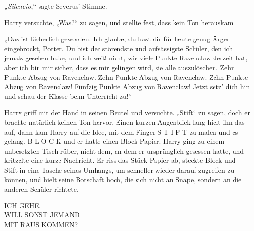 „\emph{Silencio},“ sagte Severus’ Stimme.

Harry versuchte, „Was?“ zu sagen, und stellte fest, dass kein Ton herauskam.

„Das ist lächerlich geworden. Ich glaube, du hast dir für heute genug Ärger eingebrockt, Potter. Du bist der störendste und aufsässigste Schüler, den ich jemals gesehen habe, und ich weiß nicht, wie viele Punkte Ravenclaw derzeit hat, aber ich bin mir sicher, dass es mir gelingen wird, sie alle auszulöschen. Zehn Punkte Abzug von Ravenclaw. Zehn Punkte Abzug von Ravenclaw. Zehn Punkte Abzug von Ravenclaw! Fünfzig Punkte Abzug von Ravenclaw! Jetzt setz’ dich hin und schau der Klasse beim Unterricht zu!“

Harry griff mit der Hand in seinen Beutel und versuchte, „Stift“ zu sagen, doch er brachte natürlich keinen Ton hervor. Einen kurzen Augenblick lang hielt ihn das auf, dann kam Harry auf die Idee, mit dem Finger S-T-I-F-T zu malen und es gelang. B-L-O-C-K und er hatte einen Block Papier. Harry ging zu einem unbesetzten Tisch rüber, nicht dem, an dem er ursprünglich gesessen hatte, und kritzelte eine kurze Nachricht. Er riss das Stück Papier ab, steckte Block und Stift in eine Tasche seines Umhangs, um schneller wieder darauf zugreifen zu können, und hielt seine Botschaft hoch, die sich nicht an Snape, sondern an die anderen Schüler richtete.

\begin{writtenNote}
ICH GEHE.\\
WILL SONST JEMAND\\
MIT RAUS KOMMEN?
\end{writtenNote}

